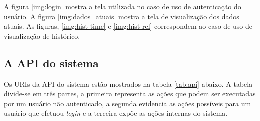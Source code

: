 A figura \ref{img:login} mostra a tela utilizada no caso de uso de autenticação do usuário. A figura \ref{img:dados_atuais} mostra a tela de visualização dos dados atuais. As figuras, \ref{img:hist-time} e \ref{img:hist-rel} correspondem ao caso de uso de visualização de histórico.

\subsection{A API do sistema} \label{subsec:api}

Os URIs da API do sistema estão mostrados na tabela \ref{tab:api} abaixo. A tabela divide-se em três partes, a primeira representa as ações que podem ser executadas por um usuário não autenticado, a segunda evidencia as ações possíveis para um usuário que efetuou \textit{login} e a terceira expõe as ações internas do sistema.


